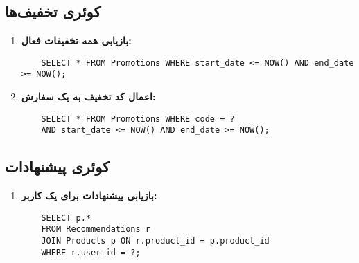 \documentclass[12pt]{article}
\begin{document}
\subsection{کوئری تخفیف‌ها}

\begin{enumerate}
    \item \textbf{بازیابی همه تخفیفات فعال:}
    \begin{latin}
    \begin{verbatim}
    SELECT * FROM Promotions WHERE start_date <= NOW() AND end_date >= NOW();
    \end{verbatim}
    \end{latin}
    
    \item \textbf{اعمال کد تخفیف به یک سفارش:}
    \begin{latin}
    \begin{verbatim}
    SELECT * FROM Promotions WHERE code = ? 
    AND start_date <= NOW() AND end_date >= NOW();
    \end{verbatim}
    \end{latin}
\end{enumerate}

\subsection{کوئری پیشنهادات}

\begin{enumerate}
    \item \textbf{بازیابی پیشنهادات برای یک کاربر:}
    \begin{latin}
    \begin{verbatim}
    SELECT p.*
    FROM Recommendations r
    JOIN Products p ON r.product_id = p.product_id
    WHERE r.user_id = ?;
    \end{verbatim}
    \end{latin}
\end{enumerate}
\end{document}
